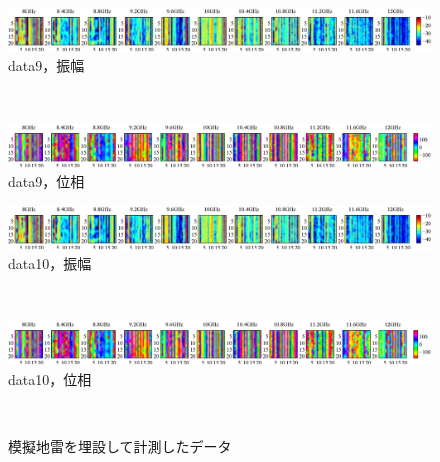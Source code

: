 ﻿\documentclass[12pt,oneside]{jsbook}
\begin{document}
\begin{figure}[hbtp]
 \begin{center}
     \begin{minipage}[c]{\hsize}
\includegraphics[width = \hsize ]{20150204_mine9_raw_a.eps}
\centering\textmd{data9，振幅}
  \end{minipage}
\\
     \begin{minipage}[c]{\hsize}
\includegraphics[width =\hsize ]{20150204_mine9_raw_p.eps}
\centering\textmd{data9，位相}
  \end{minipage}
\end{center}
\end{figure}
\begin{figure}[hbtp]
 \begin{center}
     \begin{minipage}[c]{\hsize}
\includegraphics[width = \hsize ]{20150204_mine10_raw_a.eps}
\centering\textmd{data10，振幅}
  \end{minipage}
\\
     \begin{minipage}[c]{\hsize}
\includegraphics[width =\hsize ]{20150204_mine10_raw_p.eps}
\centering\textmd{data10，位相}
  \end{minipage}
\\
\caption{模擬地雷を埋設して計測したデータ}
\label{mine-raw}
 \end{center}
\end{figure}
\end{document}

